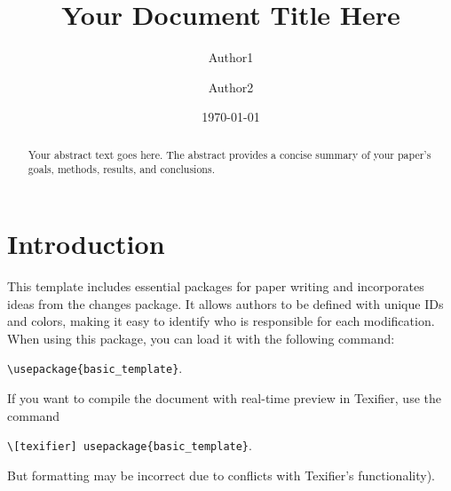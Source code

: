 \documentclass[usletter,12pt]{article}
\begin{document}
\title{\textbf{Your Document Title Here}}


\author{Author1\footnotemark[1] \and Author2\footnotemark[2]}



\date{\today}


\maketitle

\begin{abstract}
    Your abstract text goes here. The abstract provides a concise summary of your paper's goals, methods, results, and conclusions.
\end{abstract}


\section{Introduction}

This template includes essential packages for paper writing and incorporates ideas from the changes package. It allows authors to be defined with unique IDs and colors, making it easy to identify who is responsible for each modification. When using this package, you can load it with the following command:

\texttt{\textbackslash usepackage\{basic\_template\}}.

If you want to  compile the document with real-time preview in Texifier, use the command 

\texttt{\textbackslash [texifier] usepackage\{basic\_template\}}.

But formatting may be incorrect due to conflicts with Texifier's functionality).
\end{document}
